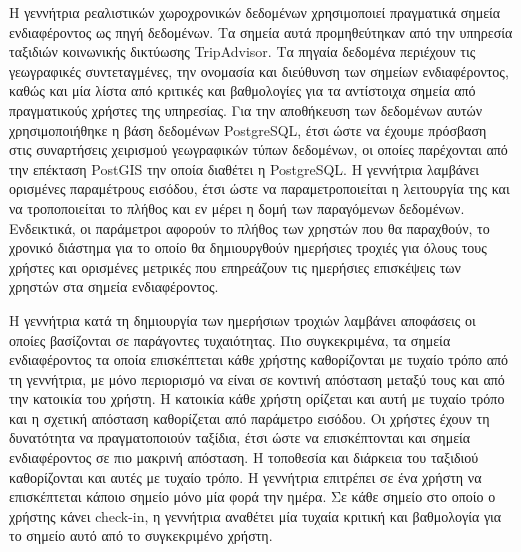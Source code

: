 Η γεννήτρια ρεαλιστικών χωροχρονικών δεδομένων χρησιμοποιεί πραγματικά σημεία \linebreak ενδιαφέροντος ως πηγή δεδομένων. Τα σημεία αυτά προμηθεύτηκαν από την υπηρεσία 
ταξιδιών κοινωνικής δικτύωσης TripAdvisor. Τα πηγαία δεδομένα περιέχουν τις γεωγραφικές \linebreak συντεταγμένες, την ονομασία και διεύθυνση των σημείων ενδιαφέροντος, 
καθώς και μία λίστα από κριτικές και βαθμολογίες για τα αντίστοιχα σημεία από πραγματικούς χρήστες της υπηρεσίας. Για την αποθήκευση των δεδομένων αυτών 
χρησιμοποιήθηκε η βάση δεδομένων PostgreSQL, έτσι ώστε να έχουμε πρόσβαση στις συναρτήσεις χειρισμού γεωγραφικών τύπων δεδομένων, οι οποίες παρέχονται 
από την επέκταση PostGIS την οποία διαθέτει η PostgreSQL. Η γεννήτρια λαμβάνει ορισμένες παραμέτρους εισόδου, έτσι ώστε να παραμετροποιείται η λειτουργία της 
και να τροποποιείται το πλήθος και εν μέρει η δομή των παραγόμενων δεδομένων. Ενδεικτικά, οι παράμετροι αφορούν το πλήθος των χρηστών που θα παραχθούν, το 
χρονικό διάστημα για το οποίο θα δημιουργθούν ημερήσιες τροχιές για όλους τους χρήστες και ορισμένες μετρικές που επηρεάζουν τις ημερήσιες επισκέψεις των χρηστών 
στα σημεία ενδιαφέροντος.

Η γεννήτρια κατά τη δημιουργία των ημερήσιων τροχιών λαμβάνει αποφάσεις οι οποίες βασίζονται σε παράγοντες τυχαιότητας. Πιο συγκεκριμένα, τα σημεία 
ενδιαφέροντος τα οποία επισκέπτεται κάθε χρήστης καθορίζονται με τυχαίο τρόπο από τη γεννήτρια, με μόνο περιορισμό να είναι σε κοντινή απόσταση μεταξύ τους και από 
την κατοικία του χρήστη. Η κατοικία κάθε χρήστη ορίζεται και αυτή με τυχαίο τρόπο και η σχετική απόσταση καθορίζεται από παράμετρο εισόδου. Οι χρήστες έχουν 
τη δυνατότητα να πραγματοποιούν ταξίδια, έτσι ώστε να επισκέπτονται και σημεία ενδιαφέροντος σε πιο μακρινή απόσταση. Η τοποθεσία και διάρκεια του ταξιδιού 
καθορίζονται και αυτές με τυχαίο τρόπο. Η γεννήτρια επιτρέπει σε ένα χρήστη να επισκέπτεται κάποιο σημείο μόνο μία φορά την ημέρα. Σε κάθε σημείο στο οποίο 
ο χρήστης κάνει check-in, η γεννήτρια αναθέτει μία τυχαία κριτική και βαθμολογία για το σημείο αυτό από το συγκεκριμένο χρήστη. 

